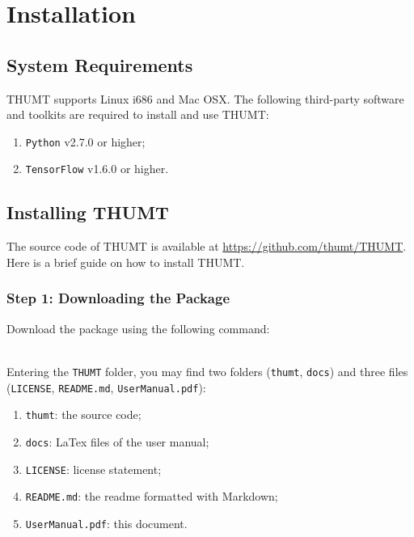 \documentclass{article}
\begin{document}
\section{Installation}

\subsection{System Requirements}
THUMT supports Linux i686 and Mac OSX. The following third-party software and toolkits are required to install and use THUMT:
\begin{enumerate}
\item \verb|Python| v2.7.0 or higher;
\item \verb|TensorFlow| v1.6.0 or higher.
\end{enumerate}

\subsection{Installing THUMT}
The source code of THUMT is available at \href{https://github.com/thumt/THUMT}{https://github.com/thumt/THUMT}. Here is a brief guide on how to install THUMT.

\subsubsection{Step 1: Downloading the Package}
Download the package using the following command:
\\
\\
Entering the \verb|THUMT| folder, you may find two folders (\verb|thumt|, \verb|docs|) and three files (\verb|LICENSE|, \verb|README.md|, \verb|UserManual.pdf|):
\begin{enumerate}
\item \verb|thumt|: the source code;
\item \verb|docs|: LaTex files of the user manual;
\item \verb|LICENSE|: license statement;
\item \verb|README.md|: the readme formatted with Markdown;
\item \verb|UserManual.pdf|: this document.
\end{enumerate}
\end{document}
